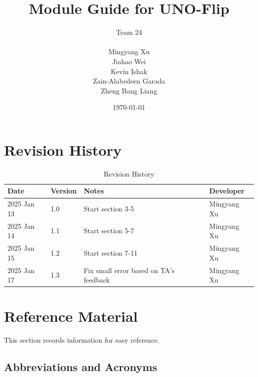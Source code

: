 \documentclass[12pt, titlepage]{article}
\begin{document}
\title{Module Guide for UNO-Flip\progname{}} 

\author{
\begin{tabular}{c}
Team 24\\
\\
Mingyang Xu \\
Jiahao Wei \\
Kevin Ishak \\
Zain-Alabedeen Garada \\
Zheng Bang Liang \\
\end{tabular}
}

\date{\today}

\maketitle


\section{Revision History}

\begin{table}[H]
\centering
\begin{tabularx}{\textwidth}{p{3cm}p{2cm}p{6cm}p{3cm}}
\toprule
{\bf Date} & {\bf Version} & {\bf Notes} & {\bf Developer}\\
\midrule
2025 Jan 13 & 1.0 & Start section 3-5 & Mingyang Xu\\
2025 Jan 14 & 1.1 & Start section 5-7 & Mingyang Xu\\
2025 Jan 15 & 1.2 & Start section 7-11 & Mingyang Xu\\
2025 Jan 17 & 1.3 & Fix small error based on TA's feedback & Mingyang Xu\\
\bottomrule
\end{tabularx}
\caption{Revision History}
\label{tab:revision_history}
\end{table}


\newpage

\section{Reference Material}

This section records information for easy reference.

\subsection{Abbreviations and Acronyms}
\end{document}
